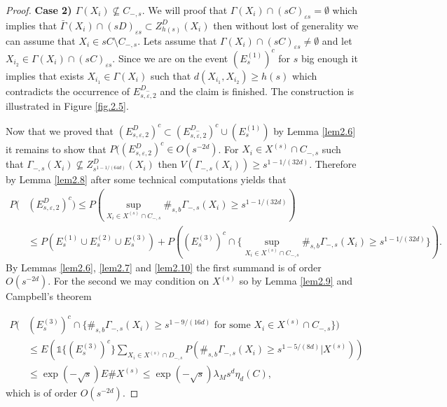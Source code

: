 \begin{proof}
\textbf{Case 2) $\Gamma(X_i) \nsubseteq C_{-,s}$}. We will proof that $\Gamma (X_i)\cap (sC)_{\varepsilon s}=\emptyset$ which implies that $\bar{\Gamma}(X_i)\cap (sD)_{\varepsilon s}\subset Z_{h(s)}^D(X_i)$ then without lost of generality we can  assume that $X_i\in sC\setminus C_{-,s}$. Lets assume that $\Gamma (X_i)\cap (sC)_{\varepsilon s}\neq\emptyset$ and let $X_{i_2}\in\Gamma (X_i)\cap (sC)_{\varepsilon s}$. Since we are on the event $(E_s^{(1)})^c$ for $s$ big enough it implies that exists $X_{i_1}\in \Gamma (X_i)$ such that  $d(X_{i_1}, X_{i_2})\geq h(s)$ which contradicts the occurrence of $E^{D_-}_{s, \varepsilon, 2}$ and the claim is finished. The construction is illustrated in Figure \ref{fig.2.5}.


Now that we proved that $(E^D_{s, \varepsilon, 2})^c\subset (E^{D_-}_{s, \varepsilon, 2})^c\cup (E_s^{(1)})$ by Lemma \ref{lem2.6} it remains to show that $P((E^D_{s, \varepsilon, 2})^c\in O(s^{-2d})$. For $X_i\in X^{(s)}\cap C_{-,s}$ such that $\Gamma_{-,s}(X_i)\nsubseteq Z^D_{s^{1-1/(64d)}}(X_i)$ then  $V(\Gamma_{-,s}(X_i))\geq s^{1-1/(32d)}$. Therefore by Lemma \ref{lem2.8} after some technical computations yields that
\small
\begin{align}
P(&(E^D_{s, \varepsilon, 2})^c)\nonumber\leq P(\sup_{X_i\in X^{(s)}\cap C_{-,s}} \#_{s,b}\Gamma_{-,s}(X_i)\geq s^{1-1/(32d)})\\
&\leq P(E_s^{(1)}\cup E_s^{(2)}\cup E_s^{(3)})+P((E_s^{(3)})^c\cap \lbrace\sup_{X_i\in X^{(s)}\cap C_{-,s}} \#_{s,b}\Gamma_{-,s}(X_i)\geq s^{1-1/(32d)}\rbrace)\nonumber.
\end{align}
\normalsize
By Lemmas \ref{lem2.6}, \ref{lem2.7} and \ref{lem2.10} the first summand is of order $O(s^{-2d})$. For the second we may condition on $X^{(s)}$ so by Lemma \ref{lem2.9} and Campbell's theorem

\begin{align}
P(&(E_s^{(3)})^c\cap\lbrace\#_{s,b}\Gamma_{-,s}(X_i)\geq s^{1-9/(16d)}\mbox{ for some }X_i\in X^{(s)}\cap C_{-,s}\rbrace)\nonumber\\
&\leq E(\mathds{1}\lbrace (E_s^{(3)})^c\rbrace\sum_{X_i\in X^{(s)}\cap D_{-,s}}P(\#_{s,b}\Gamma_{-,s}(X_i)\geq  s^{1-5/(8d)}\vert X^{(s)}))\nonumber\\
&\leq\exp (-\sqrt{s})E\#X^{(s)}\leq\exp (-\sqrt{s})\lambda_M s^d\eta_d(C),\nonumber
\end{align}
which is of order $O(s^{-2d})$.
\end{proof}


